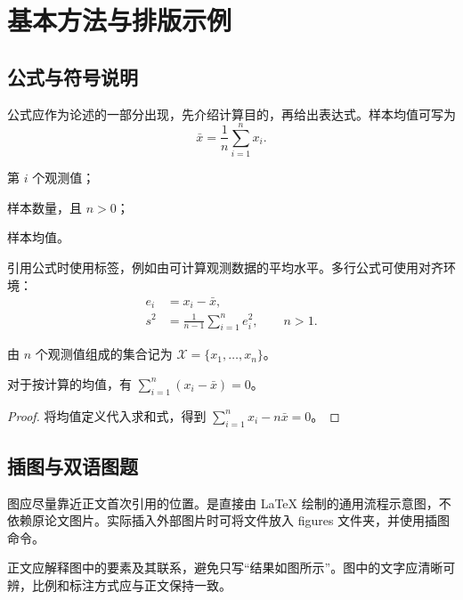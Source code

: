 \chapter{基本方法与排版示例}
\label{chap:examples}
\section{公式与符号说明}
公式应作为论述的一部分出现，先介绍计算目的，再给出表达式。样本均值可写为
\begin{equation}
\bar{x}=\frac{1}{n}\sum_{i=1}^{n}x_i .
\label{eq:mean}
\end{equation}
\begin{formulaexplain}
\item[$x_i$] 第 $i$ 个观测值；
\item[$n$] 样本数量，且 $n>0$；
\item[$\bar{x}$] 样本均值。
\end{formulaexplain}
引用公式时使用标签，例如由可计算观测数据的平均水平。多行公式可使用对齐环境：
\begin{align}
 e_i &= x_i-\bar{x},\\
 s^2 &= \frac{1}{n-1}\sum_{i=1}^{n}e_i^2,\qquad n>1.
\label{eq:variance}
\end{align}
\begin{definition}[样本集合]
由 $n$ 个观测值组成的集合记为 $\mathcal{X}=\{x_1,\ldots,x_n\}$。
\end{definition}
\begin{theorem}[离均差性质]
对于按计算的均值，有 $\sum_{i=1}^{n}(x_i-\bar{x})=0$。
\end{theorem}
\begin{proof}
将均值定义代入求和式，得到 $\sum_{i=1}^{n}x_i-n\bar{x}=0$。
\end{proof}

\section{插图与双语图题}
图应尽量靠近正文首次引用的位置。是直接由 LaTeX 绘制的通用流程示意图，不依赖原论文图片。实际插入外部图片时可将文件放入 figures 文件夹，并使用插图命令。
\begin{figure}[htbp]
\centering

\end{figure}
正文应解释图中的要素及其联系，避免只写“结果如图所示”。图中的文字应清晰可辨，比例和标注方式应与正文保持一致。

